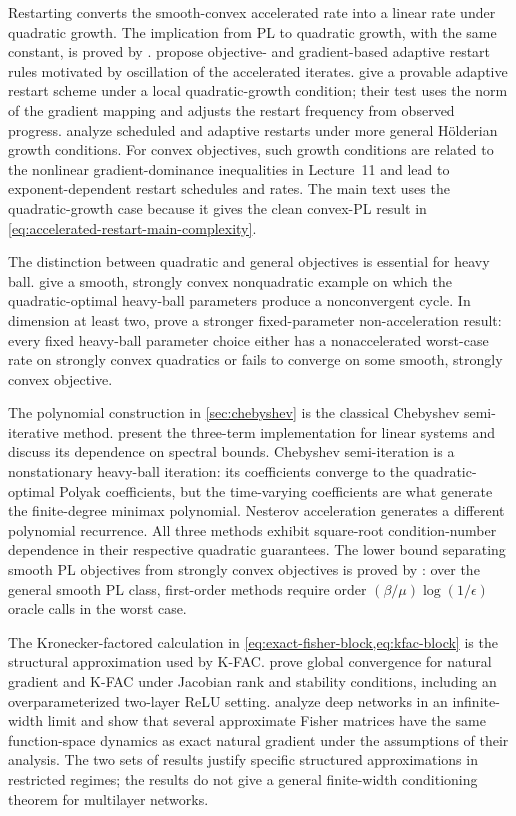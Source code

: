 \documentclass[11pt,twoside]{article}
\theoremstyle{definition}
\theoremstyle{remark}
\begin{document}
Restarting converts the smooth-convex accelerated rate into a linear rate
under quadratic growth. The implication from PL to quadratic growth, with the
same constant, is proved by \citet{karimi2016}.
\citet{odonoghue2015} propose objective- and gradient-based adaptive restart
rules motivated by oscillation of the
accelerated iterates. \citet{fercoq2019} give a provable adaptive restart
scheme under a local quadratic-growth condition; their test uses the norm of
the gradient mapping and adjusts the restart frequency from observed
progress. \citet{roulet2020} analyze scheduled and adaptive restarts under
more general H\"olderian growth conditions. For convex objectives, such growth
conditions are related to the nonlinear gradient-dominance inequalities in
Lecture~11 and lead to exponent-dependent restart schedules and rates. The
main text uses the quadratic-growth case because it gives the clean convex-PL
result in \cref{eq:accelerated-restart-main-complexity}.

The distinction between quadratic and general objectives is essential for
heavy ball. \citet{lessard2016} give a smooth, strongly convex nonquadratic
example on which the quadratic-optimal heavy-ball parameters produce a
nonconvergent cycle. In dimension at least two, \citet{goujaud2023} prove a
stronger fixed-parameter non-acceleration result: every fixed heavy-ball
parameter choice either has a nonaccelerated worst-case rate on strongly
convex quadratics or fails to converge on some smooth, strongly convex
objective.

The polynomial construction in \cref{sec:chebyshev} is the classical
Chebyshev semi-iterative method. \citet{barrett1994} present the three-term
implementation for linear systems and discuss its dependence on spectral
bounds. Chebyshev semi-iteration is a nonstationary heavy-ball iteration: its
coefficients converge to the quadratic-optimal Polyak coefficients, but the
time-varying coefficients are what generate the finite-degree minimax
polynomial. Nesterov acceleration generates a different polynomial recurrence.
All three methods exhibit square-root condition-number dependence in their
respective quadratic guarantees. The lower bound separating smooth PL
objectives from strongly convex objectives is proved by \citet{yue2023}: over
the general smooth PL class, first-order methods require order
$(\beta/\mu)\log(1/\epsilon)$ oracle calls in the worst case.

The Kronecker-factored calculation in
\cref{eq:exact-fisher-block,eq:kfac-block} is the structural approximation
used by K-FAC. \citet{zhang2019ngd} prove global convergence for natural
gradient and K-FAC under Jacobian rank and stability conditions, including an
overparameterized two-layer ReLU setting. \citet{karakida2020} analyze deep
networks in an infinite-width limit and show that several approximate Fisher
matrices have the same function-space dynamics as exact natural gradient
under the assumptions of their analysis. The two sets of results justify
specific structured approximations in restricted regimes; the results do not
give a general finite-width conditioning theorem for multilayer networks.
\end{document}
